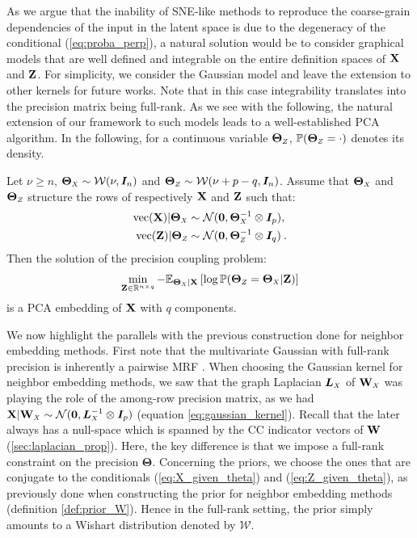 As we argue that the inability of SNE-like methods to reproduce the coarse-grain dependencies of the input in the latent space is due to the degeneracy of the conditional (\ref{eq:proba_perp}), a natural solution would be to consider graphical models that are well defined and integrable on the entire definition spaces of $\mathbf{X}$ and $\mathbf{Z}$. For simplicity, we consider the Gaussian model and leave the extension to other kernels for future works. Note that in this case integrability translates into the precision matrix being full-rank. As we see with the following, the natural extension of our framework to such models leads to a well-established PCA algorithm. In the following, for a continuous variable $\bm{\Theta}_{\scaleto{Z}{4pt}}$, $\mathbb{P}(\bm{\Theta}_{\scaleto{Z}{4pt}} = \cdot)$ denotes its density.
\begin{theorem}\label{PCA_graph_coupling}
Let $\nu \geq n$,  $\bm{\Theta}_{\scaleto{X}{4pt}} \sim \mathcal{W}(\nu, \bm{I}_n)$ and $\bm{\Theta}_{\scaleto{Z}{4pt}} \sim \mathcal{W}(\nu + p - q, \bm{I}_n)$. Assume that $\bm{\Theta}_{\scaleto{X}{4pt}}$ and $\bm{\Theta}_{\scaleto{Z}{4pt}}$ structure the rows of respectively $\mathbf{X}$ and $\mathbf{Z}$ such that: 
\begin{align}
    \mathrm{vec}(\X) | \bm{\Theta}_{\scaleto{X}{4pt}} &\sim \mathcal{N}(\bm{0}, \bm{\Theta}_{\scaleto{X}{4pt}}^{-1} \otimes \bm{I}_p), \label{eq:X_given_theta} \\
    \mathrm{vec}(\Z) | \bm{\Theta}_{\scaleto{Z}{4pt}} &\sim \mathcal{N}(\bm{0}, \bm{\Theta}_{\scaleto{Z}{4pt}}^{-1} \otimes \bm{I}_q) \label{eq:Z_given_theta} \:.
\end{align}
Then the solution of the precision coupling problem:
\begin{align*}
    \min_{\Z \in \mathbb{R}^{n \times q}} -\mathbb{E}_{\bm{\Theta}_{\scaleto{X}{3pt}} | \X}\left[\log \mathbb{P}(\bm{\Theta}_{\scaleto{Z}{4pt}}=\bm{\Theta}_{\scaleto{X}{4pt}}|\Z)\right]
\end{align*}
is a PCA embedding of $\mathbf{X}$ with $q$ components.
\end{theorem}
We now highlight the parallels with the previous construction done for neighbor embedding methods. First note that the multivariate Gaussian with full-rank precision is inherently a pairwise MRF \cite{rue2005gaussian}. When choosing the Gaussian kernel for neighbor embedding methods, we saw that the graph Laplacian $\bm{L}_{\scaleto{X}{4pt}}$ of $\W_{\scaleto{X}{4pt}}$ was playing the role of the among-row precision matrix, as we had $\X | \W_{\scaleto{X}{4pt}} \sim \mathcal{N}(\bm{0}, \bm{L}_{\scaleto{X}{4pt}}^{-1} \otimes \bm{I}_p)$ (equation \ref{eq:gaussian_kernel}). Recall that the later always has a null-space which is spanned by the CC indicator vectors of $\mathbf{W}$ (\cref{sec:laplacian_prop}). Here, the key difference is that we impose a full-rank constraint on the precision $\bm{\Theta}$. Concerning the priors, we choose the ones that are conjugate to the conditionals (\ref{eq:X_given_theta}) and (\ref{eq:Z_given_theta}), as previously done when constructing the prior for neighbor embedding methods (definition \ref{def:prior_W}). Hence in the full-rank setting, the prior simply amounts to a Wishart distribution denoted by $\mathcal{W}$.

